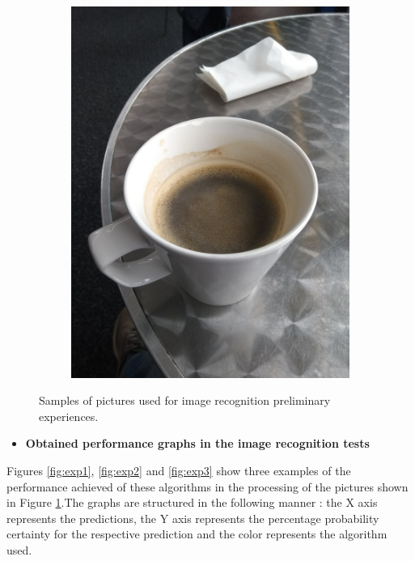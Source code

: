 \begin{figure}[H]
\begin{subfigure}{0.1968\textwidth}
    \includegraphics[width=\textwidth]{Sections/4InitialWork/4_images/run4_pic.jpg}
    \caption{}
   
  \end{subfigure}
  
    \caption[Test images for image recognition experiences]{Samples of pictures used for image recognition preliminary experiences.}
    \label{fig:experi}
    \end{figure}

    \newpage
    \begin{itemize}
      \item \textbf{Obtained performance graphs in the image recognition tests}
    \end{itemize}
    
Figures \ref{fig:exp1}, \ref{fig:exp2} and \ref{fig:exp3} show three examples of the performance achieved of these algorithms in the processing of the pictures shown in Figure \ref{fig:experi}.The graphs are structured in the following manner : the X axis represents the predictions, the Y axis represents the percentage probability certainty for the respective prediction and the color represents the algorithm used.


